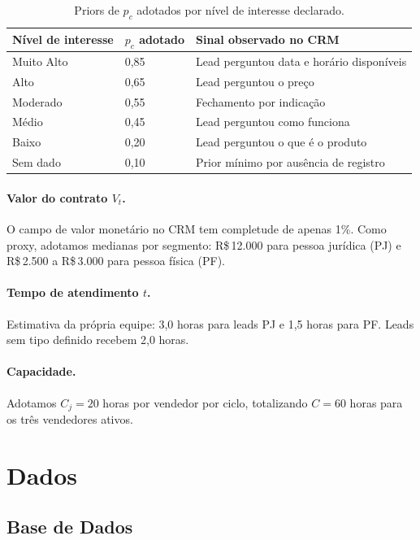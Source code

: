 \documentclass[12pt,a4paper]{article}
\begin{document}
\begin{table}[H]
\centering
\caption{Priors de $p_c$ adotados por n\'{i}vel de interesse declarado.}
\label{tab:priors}
\begin{tabular}{lll}
\toprule
\textbf{N\'{i}vel de interesse} & \textbf{$p_c$ adotado} & \textbf{Sinal observado no CRM} \\
\midrule
Muito Alto & 0,85 & Lead perguntou data e hor\'{a}rio dispon\'{i}veis \\
Alto       & 0,65 & Lead perguntou o pre\c{c}o \\
Moderado   & 0,55 & Fechamento por indica\c{c}\~{a}o \\
M\'{e}dio  & 0,45 & Lead perguntou como funciona \\
Baixo      & 0,20 & Lead perguntou o que \'{e} o produto \\
Sem dado   & 0,10 & Prior m\'{i}nimo por aus\^{e}ncia de registro \\
\bottomrule
\end{tabular}
\end{table}

\paragraph{Valor do contrato $V_t$.}
O campo de valor monet\'{a}rio no CRM tem completude de apenas 1\%. Como proxy,
adotamos medianas por segmento: R\$\,12.000 para pessoa jur\'{i}dica (PJ) e
R\$\,2.500 a R\$\,3.000 para pessoa f\'{i}sica (PF).

\paragraph{Tempo de atendimento $t$.}
Estimativa da pr\'{o}pria equipe: 3,0 horas para leads PJ e 1,5 horas para PF.
Leads sem tipo definido recebem 2,0 horas.

\paragraph{Capacidade.}
Adotamos $C_j = 20$ horas por vendedor por ciclo, totalizando
$C = 60$ horas para os tr\^{e}s vendedores ativos.

\section{Dados}

\subsection{Base de Dados}
\end{document}

